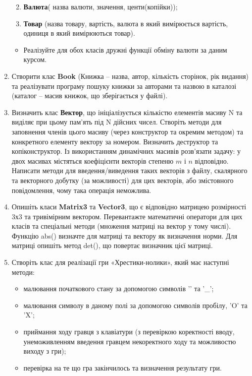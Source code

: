 \documentclass[]{article}
\begin{document}
\begin{enumerate}
  \begin{enumerate}
  \def\labelenumii{\arabic{enumii}.}
  \item
    \textbf{Валюта}( назва валюти, значення, центи(копійки));
  \item
    \textbf{Товар} (назва товару, вартість, валюта в який вимірюється
    вартість, одиниця в який вимірюються товар).
  \end{enumerate}

  \begin{itemize}
  \item
    Реалізуйте для обох класів дружні функції обміну валюти за даним
    курсом.
  \end{itemize}
\item
  Створити клас \textbf{Book} (Книжка -- назва, автор, кількість
  сторінок, рік видання) та реалізувати програму пошуку книжки за
  авторами та назвою в каталозі (каталог -- масив книжок, що
  зберігається у файлі).
\item
  Визначить клас \textbf{Вектор}, що ініціалізується кількістю елементів
  масиву N та виділяє при цьому пам'ять під N дійсних чисел. Створіть
  методи для заповнення членів цього масиву (через конструктор та
  окремим методом) та конкретного елементу вектору за номером. Визначить
  деструктор та копіконструктор. Із використанням динамічних масивів
  розв'язати задачу: у двох масивах містяться коефіцієнти векторів
  степеню \(m\) і \(n\) відповідно. Написати методи для
  введення/виведення таких векторів з файлу, скалярного та векторного
  добутку (за можливості) для цих векторів, або змістовного
  повідомлення, чому така операція неможлива.
\item
  Опишіть класи \textbf{Matrix3} та \textbf{Vector3}, що є відповідно
  матрицею розмірності 3х3 та тривімірним вектором. Перевантажте
  математичні оператори для цих класів та спеціальні методи (множення
  матриці на вектор у тому числі). Функцію abs() визначте для матриці та
  вектору як визначення норми. Для матриці опишіть метод det(), що
  повертає визначник цієї матриці.
\item
  Створіть клас для реалізації гри «Хрестики-нолики», який має наступні
  методи:

  \begin{itemize}
  \item
    малювання початкового стану за допомогою символів '\textbar{}' та
    '\_';
  \item
    малювання символу в даному полі за допомогою символів пробілу, 'O'
    та 'X';
  \item
    приймання ходу гравця з клавіатури (з перевіркою коректності вводу,
    унеможивленням введення гравцем некоректного ходу та можливостю
    виходу з гри);
  \item
    перевірка на те що гра закінчилось та визначення результату гри.
  \end{itemize}
\end{enumerate}
\end{document}
